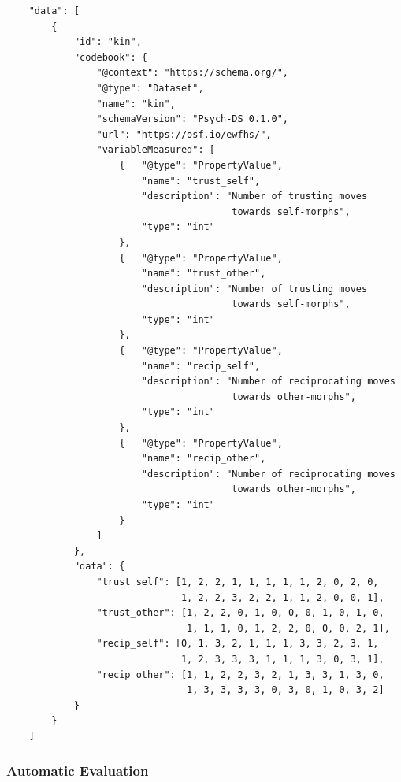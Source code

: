 \documentclass[english,doc,floatsintext]{apa6}
\begin{document}
\begin{tcolorbox}[colback=black!5!white,colframe=white!5!black,title=Box 6. The data component.]
\begin{verbatim}
    "data": [
        {
            "id": "kin",
            "codebook": {
                "@context": "https://schema.org/",
                "@type": "Dataset",
                "name": "kin",
                "schemaVersion": "Psych-DS 0.1.0",
                "url": "https://osf.io/ewfhs/",
                "variableMeasured": [
                    {   "@type": "PropertyValue",
                        "name": "trust_self",
                        "description": "Number of trusting moves
                                        towards self-morphs",
                        "type": "int"
                    },
                    {   "@type": "PropertyValue",
                        "name": "trust_other",
                        "description": "Number of trusting moves
                                        towards self-morphs",
                        "type": "int"
                    },
                    {   "@type": "PropertyValue",
                        "name": "recip_self",
                        "description": "Number of reciprocating moves 
                                        towards other-morphs",
                        "type": "int"
                    },
                    {   "@type": "PropertyValue",
                        "name": "recip_other",
                        "description": "Number of reciprocating moves
                                        towards other-morphs",
                        "type": "int"
                    }
                ]
            },
            "data": {
                "trust_self": [1, 2, 2, 1, 1, 1, 1, 1, 2, 0, 2, 0, 
                               1, 2, 2, 3, 2, 2, 1, 1, 2, 0, 0, 1],
                "trust_other": [1, 2, 2, 0, 1, 0, 0, 0, 1, 0, 1, 0,
                                1, 1, 1, 0, 1, 2, 2, 0, 0, 0, 2, 1],
                "recip_self": [0, 1, 3, 2, 1, 1, 1, 3, 3, 2, 3, 1,
                               1, 2, 3, 3, 3, 1, 1, 1, 3, 0, 3, 1],
                "recip_other": [1, 1, 2, 2, 3, 2, 1, 3, 3, 1, 3, 0,
                                1, 3, 3, 3, 3, 0, 3, 0, 1, 0, 3, 2]
            }
        }
    ]
\end{verbatim}
\end{tcolorbox}

\hypertarget{automatic-evaluation}{%
\subsubsection{Automatic Evaluation}\label{automatic-evaluation}}
\end{document}
